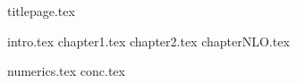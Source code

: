 \documentclass[12pt,oneside,openany]{report}
\begin{document}
{titlepage.tex}


\pagestyle{fancy}
\fancyhead{} 
\fancyhead[C]{\chaptername~\thechapter}
\fancyfoot{}
\fancyfoot[C]{\thepage}
{intro.tex}
{chapter1.tex}
{chapter2.tex}
{chapterNLO.tex}

{numerics.tex}
{conc.tex}
\clearpage
\pagestyle{plain}
\printbibliography
\end{document}
